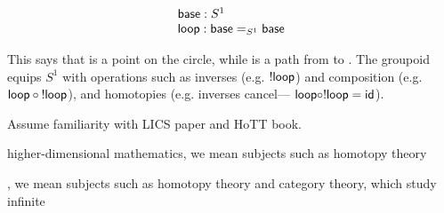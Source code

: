 \[
\begin{array}{l}
\mathsf{base} : S^1 \\
\mathsf{loop} : \mathsf{base} =_{S^1} \mathsf{base} \\
\end{array}
\]

This says that  is a point on the circle, while  is
a path from  to .  The groupoid equips $S^1$ with
operations such as inverses (e.g. $! \mathsf{loop}$) and composition
(e.g. $\mathsf{loop} \circ \mathsf{!  loop}$), and homotopies (e.g. inverses
cancel--- $\mathsf{loop} \circ ! \mathsf{loop} = \mathsf{id}$).  

Assume familiarity with LICS paper and HoTT book.  


higher-dimensional mathematics, we mean subjects such as homotopy theory

, we mean subjects such as homotopy theory and category
theory, which study infinite

